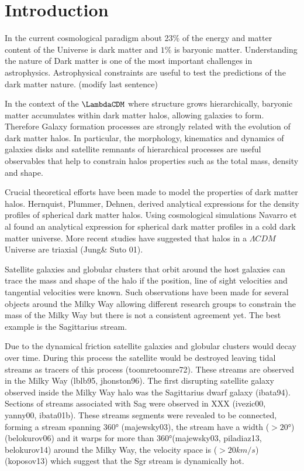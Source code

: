 \label{sec:intro}
\section{Introduction}

In the current cosmological paradigm about 23\% of the energy and matter
content of the Universe is dark matter and $1\%$ is baryonic matter.
Understanding the nature of Dark matter is one of the most important challenges in
astrophysics. Astrophysical constraints are useful to test the predictions
of the dark matter nature. (modify last sentence)

In the context of the $\LambdaCDM$ where structure grows hierarchically, baryonic matter
accumulates within dark matter halos, allowing galaxies to form. Therefore
Galaxy formation processes are strongly related with the evolution of dark
matter halos. In particular, the morphology, kinematics and dynamics of galaxies
disks and satellite remnants of hierarchical processes
are useful observables that help to constrain halos properties such as
the total mass, density and shape.

Crucial theoretical efforts have been made to model the properties of dark
matter halos. Hernquist, Plummer, Dehnen, derived analytical expressions for
the density profiles of spherical dark matter halos. Using cosmological
simulations Navarro et al found an analytical expression for spherical
dark matter profiles in a cold dark matter universe. More recent studies have
suggested that halos in a $\Lambda CDM$ Universe are triaxial (Jung\& Suto 01).

Satellite galaxies and globular clusters that orbit around the host
galaxies can trace the mass and shape of the halo if the position, line of
sight velocities and tangential velocities were known. Such observations
have been made for several objects around the Milky Way allowing different 
research groups to constrain the mass of the Milky Way but there is not a consistent
agreement yet. The best example is the Sagittarius stream.

Due to the dynamical friction satellite galaxies and globular clusters
would decay over time. During this process the satellite would be
destroyed leaving tidal streams as tracers of this process
(toomretoomre72). These streams are observed in the Milky Way (lblb95, jhonston96).
The first disrupting satellite galaxy observed inside the Milky Way halo was the Sagittarius dwarf 
galaxy (ibata94). Sections of streams associated with Sag were
observed in XXX (ivezic00, yanny00, ibata01b).
These streams segments were revealed to be connected, forming a stream
spanning $360°$ (majewsky03), the stream have a width ($>20°$) (belokurov06) and it warps
for more than $360°$(majewsky03, piladiaz13, belokurov14) around the
Milky Way, the velocity space is ($>20km/s$) (koposov13) which suggest that
the Sgr stream is dynamically hot.

